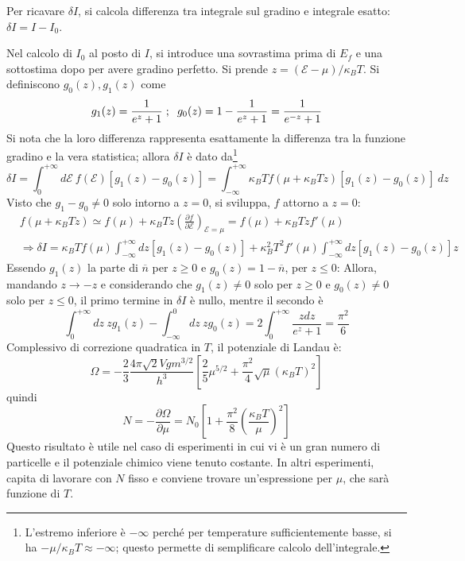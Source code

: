 \documentclass[10pt, a4paper]{scrartcl}
\numberwithin{equation}{subsection}
\theoremstyle{style1}
\begin{document}
Per ricavare $\delta I$, si calcola differenza tra integrale sul gradino e integrale esatto: $\delta I = I - I_0$.

Nel calcolo di $I_0$ al posto di $I$, si introduce una sovrastima prima di $E_f$ e una sottostima dopo per avere gradino perfetto. Si prende $z = (\mathscr{E} - \mu ) / \kappa _B T $. Si definiscono $g_0(z), g_1(z)$ come
\[
	g_1 (z) = \frac{1}{e^z +1} \hspace{.1cm} ; \hspace{.2cm} g_0(z) = 1 - \frac{1}{e^z +1} = \frac{1}{e^{-z}  +1}
\] 
Si nota che la loro differenza rappresenta esattamente la differenza tra la funzione gradino e la vera statistica; allora $\delta I$ \`e dato da\footnote{L'estremo inferiore \`e $-\infty$ perch\'e per temperature sufficientemente basse, si ha $- \mu  / \kappa _B T \approx - \infty$; questo permette di semplificare calcolo dell'integrale.}
\[
\delta I = \int_{0} ^{+\infty} d \mathscr{E} \ f(\mathscr{E}) \left[ g_1(z) - g_0(z) \right] = \int_{-\infty} ^{+\infty} \kappa _B T f(\mu +\kappa _B T z) \left[ g_1(z) - g_0(z) \right]  \ dz
\] 
Visto che $g_1-g_0 \neq 0$ solo intorno a $z=0$, si sviluppa, $f$ attorno a $z=0$:
\[
	\begin{split}
		&f(\mu  + \kappa _B T z) \simeq f(\mu ) + \kappa _B T z \left(\frac{\partial f}{\partial \mathscr{E}} \right) _{\mathscr{E} = \mu } = f(\mu ) + \kappa _B T zf '(\mu )\\
		& \Rightarrow \delta I = \kappa _B T f(\mu ) \int_{-\infty} ^{+\infty} dz \left[ g_1(z) - g_0(z) \right] + \kappa _B^2 T^2 f'(\mu ) \int_{-\infty} ^{+\infty} dz \left[ g_1(z) - g_0(z) \right] z
	\end{split}
\] 
Essendo $g_1(z)$ la parte di $\overline{n}$ per $z\ge 0$ e $g_0(z)=1 - \overline{n}$, per $z\le 0$:
Allora, mandando $z\to - z$ e considerando che $g_1(z) \neq 0 $ solo per $z\ge 0$ e $g_0(z) \neq 0$ solo per $z \le 0$, il primo termine in $\delta I$ \`e nullo, mentre il secondo \`e
\[
\int_{0} ^{+\infty} dz \ z g_1(z) - \int_{-\infty} ^0 dz \ z g_0(z) = 2 \int_{0} ^{+\infty} \frac{z dz}{e^z + 1}= \frac{\pi^2 }{6}
\] 
Complessivo di correzione quadratica in $T$, il potenziale di Landau \`e:
\begin{equation}
	\Omega = -\frac{2}{3} \frac{4 \pi \sqrt{2} V g m^{ 3 /2 } }{h^3}\left[ \frac{2}{5} \mu ^{5 / 2} + \frac{\pi^2 }{4} \sqrt{\mu } (\kappa _B  T )^2  \right] 
\end{equation}
quindi 
\begin{equation}
	N = - \frac{\partial \Omega }{\partial \mu } = N_0 \left[ 1 + \frac{\pi^2}{8} \left(\frac{\kappa _B T}{\mu }\right) ^2 \right] 
\end{equation}
Questo risultato è utile nel caso di esperimenti in cui vi \`e un gran numero di particelle e il potenziale chimico viene tenuto costante.
In altri esperimenti, capita di lavorare con $N$ fisso e conviene trovare un'espressione per $\mu $, che sarà funzione di $T$.
\end{document}
